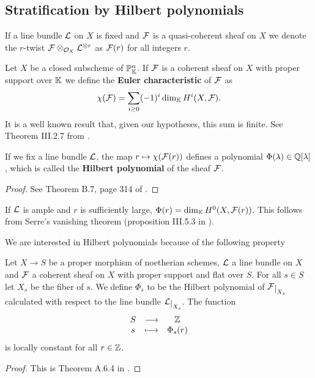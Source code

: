 \subsection{Stratification by Hilbert polynomials}
\begin{notation}
If a line bundle $\mathcal{L}$ on $X$ is fixed and $\mathcal{F}$ is a quasi-coherent sheaf on $X$ we denote the $r$-twist $\mathcal{F}\otimes_{\mathcal{O}_X}\mathcal{L}^{\otimes r}$ as $\mathcal{F}(r)$ for all integers $r$.
\end{notation}
\begin{definition}
Let $X$ be a closed subscheme of $\mathbb{P}^n_{\mathbb{K}}$. If $\mathcal{F}$ is a coherent sheaf on $X$ with proper support over $\mathbb{K}$ we define the \textbf{Euler characteristic} of $\mathcal{F}$ as
\[\chi(\mathcal{F})=\sum_{i\geq 0}(-1)^i\dim_{\mathbb{K}} H^i(X,\mathcal{F}).\]
It is a well known result that, given our hypotheses, this sum is finite. See Theorem {\sc III}.2.7 from \cite{Hartshorne}.
\end{definition}

\begin{theorem}
If we fix a line bundle $\mathcal{L}$, the map $r\mapsto \chi(\mathcal{F}(r))$ defines a polynomial $\Phi(\lambda)\in\mathbb{Q}[\lambda]$, which is called the \textbf{Hilbert polynomial} of the sheaf $\mathcal{F}$.
\end{theorem}
\begin{proof}
See Theorem B.7, page 314 of \cite{FGAEXPLAINED}.
\end{proof}

\begin{remark}\label{HilbertoPolynomialGivesDimentionForLargeInput}
If $\mathcal{L}$ is ample and $r$ is sufficiently large, $\Phi(r)=\dim_{\mathbb{K}} H^0(X,\mathcal{F}(r))$. This follows from Serre's vanishing theorem (proposition {\rm III}.5.3 in \cite{Hartshorne}).
\end{remark}

We are interested in Hilbert polynomials because of the following property

\begin{theorem}\label{SemicontinuityTheorem}
Let $X\to S$ be a proper morphism of noetherian schemes, $\mathcal{L}$ a line bundle on $X$ and $\mathcal{F}$ a coherent sheaf on $X$ with proper support and flat over $S$. For all $s\in S$ let $X_s$ be the fiber of $s$. We define $\Phi_s$ to be the Hilbert polynomial of $\Fc\res{X_s}$ calculated with respect to the line bundle $\Lc\res{X_s}$. The function
\[\begin{array}{ccc} {S} & \longrightarrow & {\mathbb{Z}}\\ {s} & \longmapsto & {\Phi_s(r)} \end{array}\]
is locally constant for all $r\in\mathbb{Z}$.
\end{theorem}
\begin{proof}
This is Theorem A.6.4 in \cite{Alper}.
\end{proof}

